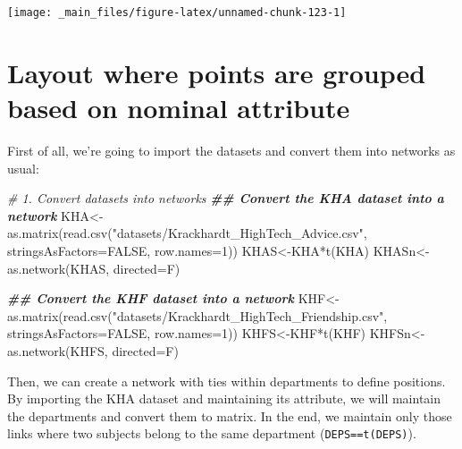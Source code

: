 \documentclass[
  notitlepage,
  onecolumn,
  openany]{book}
\newenvironment{Shaded}{\begin{snugshade}}{\end{snugshade}}
\newcommand{\AttributeTok}[1]{\textcolor[rgb]{0.77,0.63,0.00}{#1}}
\newcommand{\CommentTok}[1]{\textcolor[rgb]{0.56,0.35,0.01}{\textit{#1}}}
\newcommand{\ConstantTok}[1]{\textcolor[rgb]{0.00,0.00,0.00}{#1}}
\newcommand{\DecValTok}[1]{\textcolor[rgb]{0.00,0.00,0.81}{#1}}
\newcommand{\DocumentationTok}[1]{\textcolor[rgb]{0.56,0.35,0.01}{\textbf{\textit{#1}}}}
\newcommand{\FunctionTok}[1]{\textcolor[rgb]{0.00,0.00,0.00}{#1}}
\newcommand{\NormalTok}[1]{#1}
\newcommand{\OtherTok}[1]{\textcolor[rgb]{0.56,0.35,0.01}{#1}}
\newcommand{\SpecialCharTok}[1]{\textcolor[rgb]{0.00,0.00,0.00}{#1}}
\newcommand{\StringTok}[1]{\textcolor[rgb]{0.31,0.60,0.02}{#1}}
\begin{document}
\begin{center}\texttt{[image: \_main\_files/figure-latex/unnamed-chunk-123-1]} \end{center}

\hypertarget{layout-where-points-are-grouped-based-on-nominal-attribute}{%
\section{Layout where points are grouped based on nominal attribute}\label{layout-where-points-are-grouped-based-on-nominal-attribute}}

First of all, we're going to import the datasets and convert them into networks as usual:

\begin{Shaded}
\begin{Highlighting}[]
\CommentTok{\# 1. Convert datasets into networks}
\DocumentationTok{\#\# Convert the KHA dataset into a network}
\NormalTok{KHA}\OtherTok{\textless{}{-}}\FunctionTok{as.matrix}\NormalTok{(}\FunctionTok{read.csv}\NormalTok{(}\StringTok{"datasets/Krackhardt\_HighTech\_Advice.csv"}\NormalTok{,}
                        \AttributeTok{stringsAsFactors=}\ConstantTok{FALSE}\NormalTok{, }\AttributeTok{row.names=}\DecValTok{1}\NormalTok{))}
\NormalTok{KHAS}\OtherTok{\textless{}{-}}\NormalTok{KHA}\SpecialCharTok{*}\FunctionTok{t}\NormalTok{(KHA)}
\NormalTok{KHASn}\OtherTok{\textless{}{-}}\FunctionTok{as.network}\NormalTok{(KHAS, }\AttributeTok{directed=}\NormalTok{F)}

\DocumentationTok{\#\# Convert the KHF dataset into a network}
\NormalTok{KHF}\OtherTok{\textless{}{-}}\FunctionTok{as.matrix}\NormalTok{(}\FunctionTok{read.csv}\NormalTok{(}\StringTok{"datasets/Krackhardt\_HighTech\_Friendship.csv"}\NormalTok{,}
                        \AttributeTok{stringsAsFactors=}\ConstantTok{FALSE}\NormalTok{, }\AttributeTok{row.names=}\DecValTok{1}\NormalTok{))}
\NormalTok{KHFS}\OtherTok{\textless{}{-}}\NormalTok{KHF}\SpecialCharTok{*}\FunctionTok{t}\NormalTok{(KHF)}
\NormalTok{KHFSn}\OtherTok{\textless{}{-}}\FunctionTok{as.network}\NormalTok{(KHFS, }\AttributeTok{directed=}\NormalTok{F)}
\end{Highlighting}
\end{Shaded}

Then, we can create a network with ties within departments to define positions. By importing the KHA dataset and maintaining its attribute, we will maintain the departments and convert them to matrix. In the end, we maintain only those links where two subjects belong to the same department (\texttt{DEPS==t(DEPS)}).
\end{document}
